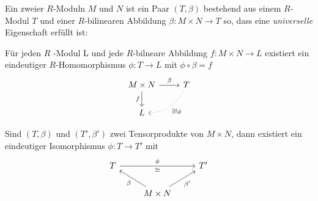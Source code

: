 \documentclass[../main.tex]{subfiles}
\begin{document}
\begin{definition}
    Ein  zweier $R$-Moduln $M$ und $N$ ist ein Paar $(T,\beta)$ bestehend aus einem $R$-Modul $T$ und einer $R$-bilinearen Abbildung $\beta:M\times N\rightarrow T$ so, dass eine \textit{universelle} Eigenschaft erfüllt ist:
    
    Für jeden $R$ -Modul L und jede $R$-bilneare Abbildung $f:M\times N\rightarrow L$ existiert ein eindeutiger $R$-Homomorphismus $\phi:T\rightarrow L$ mit $\phi\circ\beta = f$
    $$%
\begin{tikzcd}
M\times N \arrow[d, "f"'] \arrow[r, "\beta"] & T \arrow[ld, "\exists !\phi", dotted, bend left] \\
L                                            &                                                 
\end{tikzcd}$$
\end{definition}
\begin{lemma}
    Sind $(T,\beta)$ und $(T',\beta')$ zwei Tensorprodukte von $M\times N$, dann existiert ein eindeutiger Isomorphismus $\phi: T\rightarrow T'$ mit
$$%
\begin{tikzcd}
T \arrow[rr, "\phi", "\cong"'] &                                                     & T' \\
                     & M\times N \arrow[lu, "\beta"] \arrow[ru, "\beta'"'] &   
\end{tikzcd}$$
\end{lemma}
\end{document}
